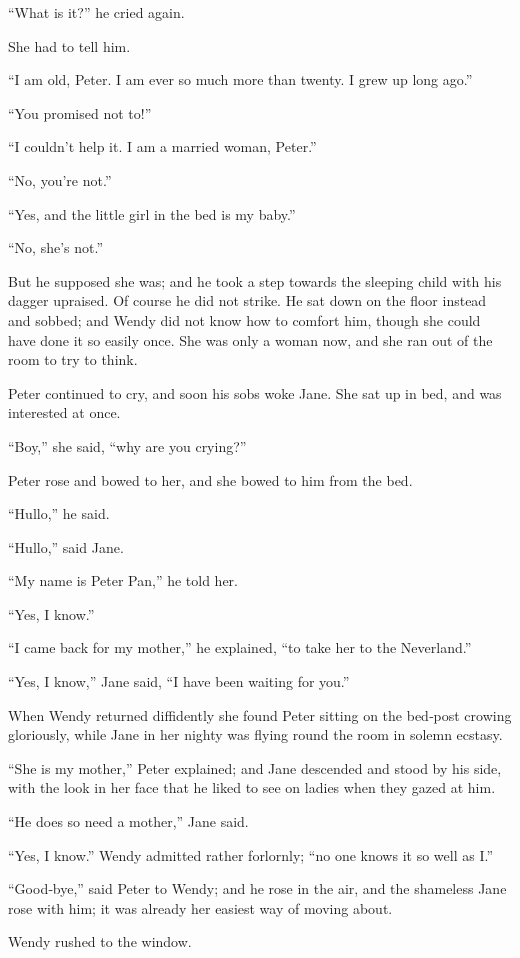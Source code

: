 “What is it?\@” he cried again.

She had to tell him.

“I am old, Peter.
I am ever so much more than twenty.
I grew up long ago.”

“You promised not to!”

“I couldn’t help it.
I am a married woman, Peter.”

“No, you’re not.”

“Yes, and the little girl in the bed is my baby.”

“No, she’s not.”

But he supposed she was;
and he took a step towards the sleeping child with his dagger upraised.
Of course he did not strike.
He sat down on the floor instead and sobbed;
and Wendy did not know how to comfort him,
though she could have done it so easily once.
She was only a woman now, and she ran out of the room to try to think.

Peter continued to cry, and soon his sobs woke Jane.
She sat up in bed, and was interested at once.

“Boy,” she said, “why are you crying?”

Peter rose and bowed to her, and she bowed to him from the bed.

“Hullo,” he said.

“Hullo,” said Jane.

“My name is Peter Pan,” he told her.

“Yes, I know.”

“I came back for my mother,” he explained,
“to take her to the Neverland.”

“Yes, I know,” Jane said, “I have been waiting for you.”

When Wendy returned diffidently
she found Peter sitting on the bed‐post crowing gloriously,
while Jane in her nighty was flying round the room in solemn ecstasy.

“She is my mother,” Peter explained;
and Jane descended and stood by his side,
with the look in her face that he liked to see on ladies when they gazed at him.

“He does so need a mother,” Jane said.

“Yes, I know.”
Wendy admitted rather forlornly;
“no one knows it so well as I\@.”

“Good‐bye,” said Peter to Wendy;
and he rose in the air, and the shameless Jane rose with him;
it was already her easiest way of moving about.

Wendy rushed to the window.

